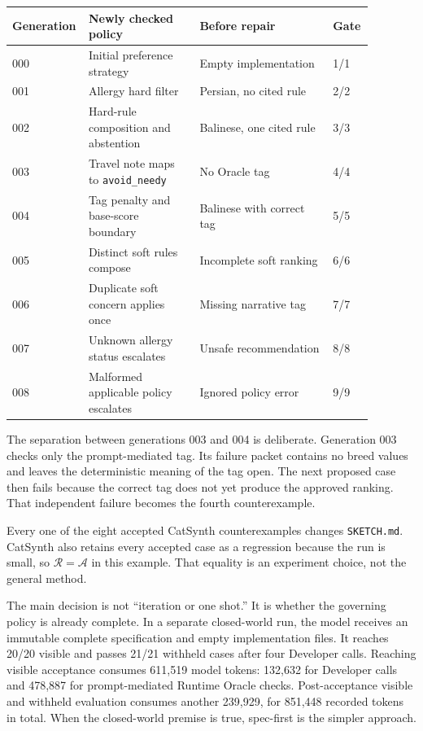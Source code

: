 \documentclass[11pt]{article}
\newcommand{\archive}{\mathcal{A}}
\newcommand{\regression}{\mathcal{R}}
\begin{document}
\begin{center}
\small
\begin{tabular}{p{0.12\linewidth}p{0.30\linewidth}p{0.36\linewidth}p{0.10\linewidth}}
\toprule
Generation & Newly checked policy & Before repair & Gate \\
\midrule
000 & Initial preference strategy & Empty implementation & 1/1 \\
001 & Allergy hard filter & Persian, no cited rule & 2/2 \\
002 & Hard-rule composition and abstention & Balinese, one cited rule & 3/3 \\
003 & Travel note maps to \texttt{avoid\_needy} & No Oracle tag & 4/4 \\
004 & Tag penalty and base-score boundary & Balinese with correct tag & 5/5 \\
005 & Distinct soft rules compose & Incomplete soft ranking & 6/6 \\
006 & Duplicate soft concern applies once & Missing narrative tag & 7/7 \\
007 & Unknown allergy status escalates & Unsafe recommendation & 8/8 \\
008 & Malformed applicable policy escalates & Ignored policy error & 9/9 \\
\bottomrule
\end{tabular}
\end{center}

The separation between generations 003 and 004 is deliberate.  Generation 003 checks only the
prompt-mediated tag.  Its failure packet contains no breed values and leaves the deterministic
meaning of the tag open.  The next proposed case then fails because the correct tag does not yet
produce the approved ranking.  That independent failure becomes the fourth counterexample.

Every one of the eight accepted CatSynth counterexamples changes \texttt{SKETCH.md}.  CatSynth
also retains every accepted case as a regression because the run is small, so
$\regression = \archive$ in this example.  That equality is an experiment choice, not the
general method.

The main decision is not ``iteration or one shot.''  It is whether the governing policy is
already complete.  In a separate closed-world run, the model receives an immutable complete
specification and empty implementation files.  It reaches 20/20 visible and passes 21/21 withheld cases
after four Developer calls.  Reaching visible acceptance consumes 611,519 model tokens: 132,632
for Developer calls and 478,887 for prompt-mediated Runtime Oracle checks.  Post-acceptance
visible and withheld evaluation consumes another 239,929, for 851,448 recorded tokens in total.
When the closed-world premise is true, spec-first is the simpler approach.
\end{document}
